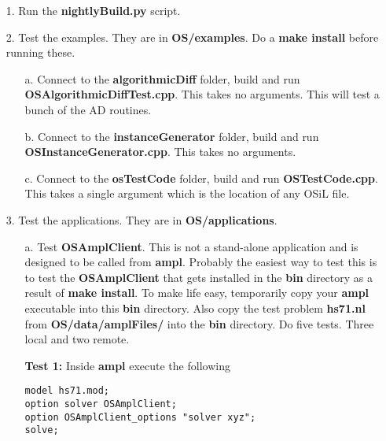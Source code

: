 \label{section:ReleaseProcedure} 

\begin{itemize}

\item[1.] Run the {\bf nightlyBuild.py} script.

\item[2.] Test the examples.  They are in {\bf OS/examples}.  Do a {\bf make install} before running these.

\begin{itemize}

\item[a.]  Connect to the {\bf algorithmicDiff} folder, build and run {\bf OSAlgorithmicDiffTest.cpp}.  This takes no arguments.  This will test a bunch of the AD routines.



\item[b.]  Connect to the {\bf instanceGenerator} folder, build and run {\bf OSInstanceGenerator.cpp}.  This takes no arguments.

\item[c.]  Connect to the {\bf osTestCode} folder, build and run {\bf OSTestCode.cpp}.  This takes a single argument which is the location of any OSiL file.


\end{itemize}

\item[3.] Test the applications.  They are in {\bf OS/applications}.

\begin{itemize}
 
 
 \item[a.]  Test {\bf OSAmplClient}.  This is not a stand-alone application and is designed to be called from  {\bf ampl}.   Probably the easiest way to test this is to test the {\bf OSAmplClient}  that gets installed in the {\bf bin} directory as a result of {\bf make install}. To make life easy, temporarily copy your {\bf ampl} executable into this {\bf bin} directory.   Also copy the test problem {\bf hs71.nl}  from {\bf OS/data/amplFiles/} into the {\bf bin} directory.   Do five tests. Three local and two remote.
 
 
 \vskip 10pt
 
 
 {\bf Test 1:}  Inside  {\bf ampl} execute the following
 


\begin{verbatim}
model hs71.mod;
option solver OSAmplClient;
option OSAmplClient_options "solver xyz";
solve;
\end{verbatim}


\end{itemize}
\end{itemize}

